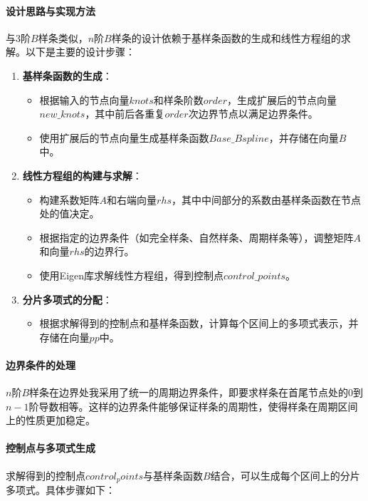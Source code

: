 \documentclass[a4paper]{article}
\begin{document}
\paragraph{设计思路与实现方法}
与$3$阶$B$样条类似，$n$阶$B$样条的设计依赖于基样条函数的生成和线性方程组的求解。以下是主要的设计步骤：

\begin{enumerate}
    \item \textbf{基样条函数的生成}：
        \begin{itemize}
            \item 根据输入的节点向量$knots$和样条阶数$order$，生成扩展后的节点向量$new\_knots$，其中前后各重复$order$次边界节点以满足边界条件。
            \item 使用扩展后的节点向量生成基样条函数$Base\_Bspline$，并存储在向量$B$中。
        \end{itemize}

    \item \textbf{线性方程组的构建与求解}：
        \begin{itemize}
            \item 构建系数矩阵$A$和右端向量$rhs$，其中中间部分的系数由基样条函数在节点处的值决定。
            \item 根据指定的边界条件（如完全样条、自然样条、周期样条等），调整矩阵$A$和向量$rhs$的边界行。
            \item 使用Eigen库求解线性方程组，得到控制点$control\_points$。
        \end{itemize}

    \item \textbf{分片多项式的分配}：
        \begin{itemize}
            \item 根据求解得到的控制点和基样条函数，计算每个区间上的多项式表示，并存储在向量$pp$中。
        \end{itemize}
\end{enumerate}

\paragraph{边界条件的处理}
$n$阶$B$样条在边界处我采用了统一的周期边界条件，即要求样条在首尾节点处的$0$到$n-1$阶导数相等。这样的边界条件能够保证样条的周期性，使得样条在周期区间上的性质更加稳定。

\paragraph{控制点与多项式生成}
    求解得到的控制点$control_points$与基样条函数$B$结合，可以生成每个区间上的分片多项式。具体步骤如下：
\end{document}
